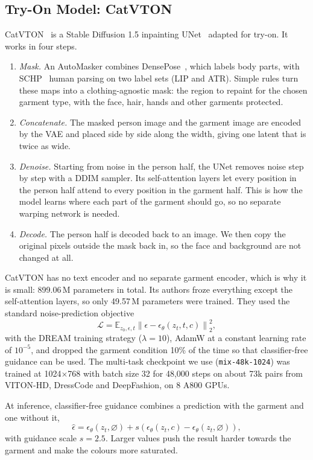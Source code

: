 \documentclass{article}
\begin{document}
\subsection{Try-On Model: CatVTON}
\label{sec:catvton}
CatVTON~\cite{catvton} is a Stable Diffusion 1.5 inpainting UNet~\cite{ldm} adapted for try-on. It works in
four steps.
\begin{enumerate}
\item \emph{Mask.} An AutoMasker combines DensePose~\cite{densepose}, which labels body parts, with
SCHP~\cite{schp} human parsing on two label sets (LIP and ATR). Simple rules turn these maps into a
clothing-agnostic mask: the region to repaint for the chosen garment type, with the face, hair, hands
and other garments protected.
\item \emph{Concatenate.} The masked person image and the garment image are encoded by the VAE and
placed side by side along the width, giving one latent that is twice as wide.
\item \emph{Denoise.} Starting from noise in the person half, the UNet removes noise step by step with a
DDIM sampler. Its self-attention layers let every position in the person half attend to every position
in the garment half. This is how the model learns where each part of the garment should go, so no
separate warping network is needed.
\item \emph{Decode.} The person half is decoded back to an image. We then copy the original pixels
outside the mask back in, so the face and background are not changed at all.
\end{enumerate}

CatVTON has no text encoder and no separate garment encoder, which is why it is small: 899.06\,M
parameters in total. Its authors froze everything except the self-attention layers, so only 49.57\,M
parameters were trained. They used the standard noise-prediction objective
\begin{equation}
\mathcal{L}=\mathbb{E}_{z_0,\epsilon,t}\left\|\epsilon-\epsilon_\theta(z_t,t,c)\right\|_2^2,
\end{equation}
with the DREAM training strategy ($\lambda=10$), AdamW at a constant learning rate of $10^{-5}$, and
dropped the garment condition 10\% of the time so that classifier-free guidance can be used. The
multi-task checkpoint we use (\texttt{mix-48k-1024}) was trained at 1024$\times$768 with batch size 32
for 48{,}000 steps on about 73k pairs from VITON-HD, DressCode and DeepFashion, on 8 A800 GPUs.

At inference, classifier-free guidance combines a prediction with the garment and one without it,
\begin{equation}
\hat\epsilon=\epsilon_\theta(z_t,\varnothing)+s\left(\epsilon_\theta(z_t,c)-\epsilon_\theta(z_t,\varnothing)\right),
\end{equation}
with guidance scale $s=2.5$. Larger values push the result harder towards the garment and make the
colours more saturated.
\end{document}
